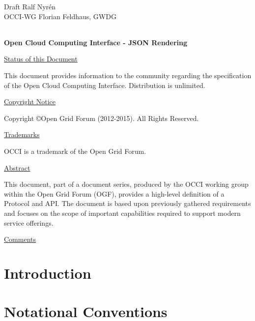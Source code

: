 \documentclass[10pt,a4paper]{article}
\begin{document}
\thispagestyle{empty}

Draft \hfill Ralf Nyrén \\
OCCI-WG \hfill Florian Feldhaus, GWDG\\
\\

\vspace*{0.5in}

\begin{Large}
\textbf{Open Cloud Computing Interface - JSON Rendering}
\end{Large}

\vspace*{0.5in}

\underline{Status of this Document}

This document provides information to the community regarding the
specification of the Open Cloud Computing Interface. Distribution is
unlimited.

\underline{Copyright Notice}

Copyright \copyright Open Grid Forum (2012-2015). All Rights Reserved.

\underline{Trademarks}

OCCI is a trademark of the Open Grid Forum.

\underline{Abstract}

This document, part of a document series, produced by the OCCI working
group within the Open Grid Forum (OGF), provides a high-level
definition of a Protocol and API. The document is based upon
previously gathered requirements and focuses on the scope of important
capabilities required to support modern service offerings.

\underline{Comments}
\newcommand{\ralf}[1]{\textcolor{red}{RN: #1}}
\newcommand{\andy}[1]{\textcolor{green}{AE: #1}}
\newcommand{\florian}[1]{\textcolor{blue}{FF: #1}}

\newpage
\tableofcontents
\newpage

\section{Introduction}


\section{Notational Conventions}

\end{document}
